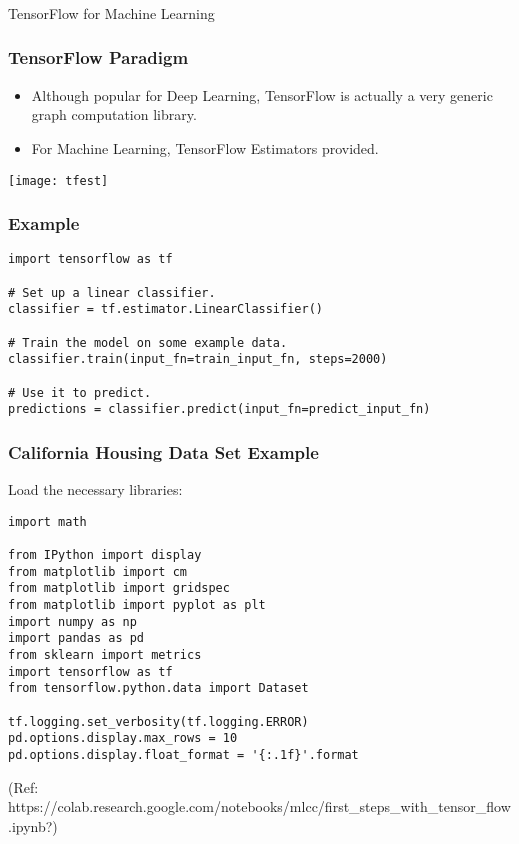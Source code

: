 \begin{frame}[fragile]\frametitle{}
\begin{center}
{\Large TensorFlow for Machine Learning}
\end{center}
\end{frame}

\begin{frame}[fragile]\frametitle{TensorFlow Paradigm}
\begin{itemize}
\item Although popular for Deep Learning, TensorFlow is actually a very generic graph computation library.
\item For Machine Learning, TensorFlow Estimators provided.
\end{itemize}

\begin{center}
\texttt{[image: tfest]}
\end{center}

\end{frame}

\begin{frame}[fragile]\frametitle{Example}
\begin{lstlisting}
import tensorflow as tf

# Set up a linear classifier.
classifier = tf.estimator.LinearClassifier()

# Train the model on some example data.
classifier.train(input_fn=train_input_fn, steps=2000)

# Use it to predict.
predictions = classifier.predict(input_fn=predict_input_fn)
\end{lstlisting}
\end{frame}


\begin{frame}[fragile]\frametitle{California Housing Data Set Example}
Load the necessary libraries:
\begin{lstlisting}
import math

from IPython import display
from matplotlib import cm
from matplotlib import gridspec
from matplotlib import pyplot as plt
import numpy as np
import pandas as pd
from sklearn import metrics
import tensorflow as tf
from tensorflow.python.data import Dataset

tf.logging.set_verbosity(tf.logging.ERROR)
pd.options.display.max_rows = 10
pd.options.display.float_format = '{:.1f}'.format
\end{lstlisting}

(Ref: https://colab.research.google.com/notebooks/mlcc/first\_steps\_with\_tensor\_flow.ipynb?)
\end{frame}


